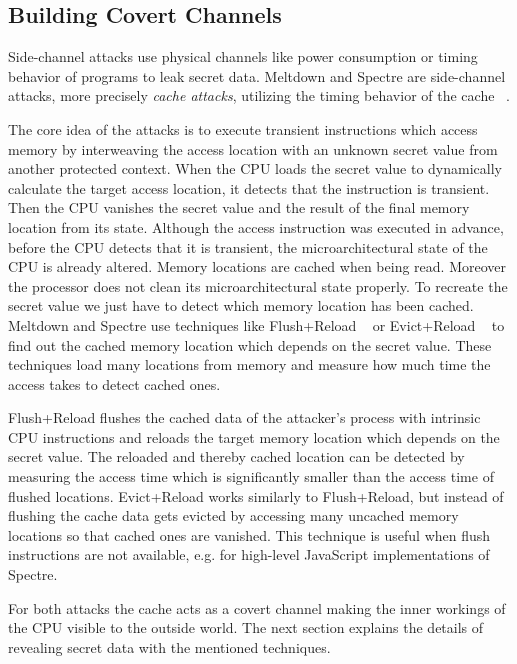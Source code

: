 \documentclass[a4paper,oneside,openright] {scrreprt}
\begin{document}
 \subsection{Building Covert Channels}
\label{ch:intro:motivation:A}

Side-channel attacks use physical channels like power consumption or timing behavior of programs to
leak secret data. Meltdown and Spectre are side-channel attacks, more precisely \textit{cache attacks}, 
utilizing the timing behavior of the cache ~\cite{osvik2006cache}.

The core idea of the attacks is to execute transient instructions 
which access memory by interweaving the access location with an unknown secret value from another protected context. 
When the CPU loads the secret value to dynamically calculate the target access location, 
it detects that the instruction is transient.
Then the CPU vanishes the secret value and the result of the final memory location from its state. 
Although the access instruction was executed in advance, before the CPU detects that it is transient, the microarchitectural state
 of the CPU is already altered.
Memory locations are cached when being read. Moreover the processor does not clean its microarchitectural state properly.
To recreate the secret value we just have to detect which memory location has been cached.
 Meltdown and Spectre use techniques like Flush+Reload ~\cite{yarom2014flush} 
 or Evict+Reload ~\cite{gruss2015cache} to find out the cached memory location which depends on the secret value.
These techniques load many locations from memory and measure how much time the access takes to detect cached ones.

Flush+Reload flushes the cached data of the attacker's process with intrinsic CPU instructions and reloads the target memory location
which depends on the secret value.
The reloaded and thereby cached location can be detected by measuring the access time which is significantly smaller than the access
time of flushed locations.
Evict+Reload works similarly to Flush+Reload, but instead of flushing the cache data gets evicted by accessing many uncached memory
locations so that cached ones are vanished.
This technique is useful when flush instructions are not available, e.g. for high-level JavaScript implementations of Spectre. 

For both attacks the cache acts as a covert channel making the inner workings of the CPU visible to the outside world. 
The next section explains the details of revealing secret data with the mentioned techniques. 
\end{document}
